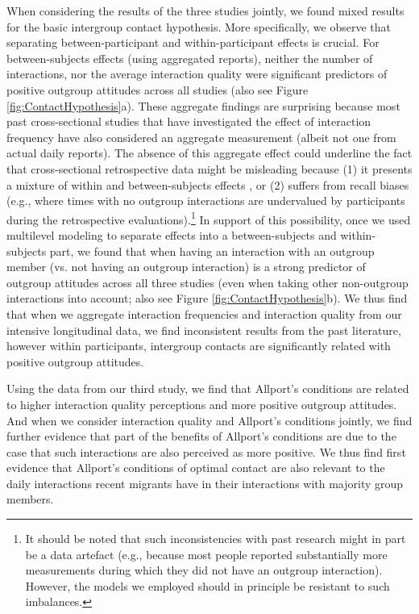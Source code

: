 \documentclass[man, 12pt, a4paper, mask]{apa7}
\theoremstyle{break}
\theoremstyle{plain}
\begin{document}
When considering the results of the three studies jointly, we found mixed results for the basic intergroup contact hypothesis. More specifically, we observe that separating between-participant and within-participant effects is crucial. For between-subjects effects (using aggregated reports), neither the number of interactions, nor the average interaction quality were significant predictors of positive outgroup attitudes across all studies (also see Figure \ref{fig:ContactHypothesis}a). These aggregate findings are surprising because most past cross-sectional studies that have investigated the effect of interaction frequency have also considered an aggregate measurement (albeit not one from actual daily reports). The absence of this aggregate effect could underline the fact that cross-sectional retrospective data might be misleading because (1) it presents a mixture of within and between-subjects effects \citep[][]{Hamaker2020}, or (2) suffers from recall biases (e.g., where times with no outgroup interactions are undervalued by participants during the retrospective evaluations).\footnote{It should be noted that such inconsistencies with past research might in part be a data artefact (e.g., because most people reported substantially more measurements during which they did not have an outgroup interaction). However, the models we employed should in principle be resistant to such imbalances.} In support of this possibility, once we used multilevel modeling to separate effects into a between-subjects and within-subjects part, we found that when having an interaction with an outgroup member (vs. not having an outgroup interaction) is a strong predictor of outgroup attitudes across all three studies (even when taking other non-outgroup interactions into account; also see Figure \ref{fig:ContactHypothesis}b). We thus find that when we aggregate interaction frequencies and interaction quality from our intensive longitudinal data, we find inconsistent results from the past literature, however within participants, intergroup contacts are significantly related with positive outgroup attitudes.

Using the data from our third study, we find that Allport's conditions are related to higher interaction quality perceptions and more positive outgroup attitudes. And when we consider interaction quality and Allport's conditions jointly, we find further evidence that part of the benefits of Allport's conditions are due to the case that such interactions are also perceived as more positive. We thus find first evidence that Allport's conditions of optimal contact are also relevant to the daily interactions recent migrants have in their interactions with majority group members. 
\end{document}
